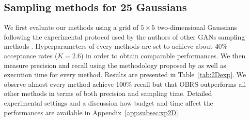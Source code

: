\documentclass[twoside]{article}
\begin{document}
\subsection{Sampling methods for 25 Gaussians}
We first evaluate our methods  using a grid of $5\times 5$ two-dimensional Gaussians following the experimental protocol used by the authors of other GANs sampling methods \citep{azadi_discriminator_2019, turner_metropolis-hastings_2019, ansari_refining_2021, che_your_2021, tanaka_discriminator_2019}. Hyperparameters of every methods are set to achieve about 40\% acceptance rates ($K=2.6$) in order to obtain comparable performances. We then measure precision and recall using the methodology proposed by \citet{dumoulin_adversarially_2017} as well as execution time for every method. Results are presented in Table~\ref{tab:2Dexp}. We observe almost every method achieve 100\% recall but that OBRS outperforms all other methods in terms of both precision and sampling time. Detailed experimental settings and a discussion how budget and time affect the performances are available in Appendix~\ref{app:subsec:xp2D}.
\end{document}
